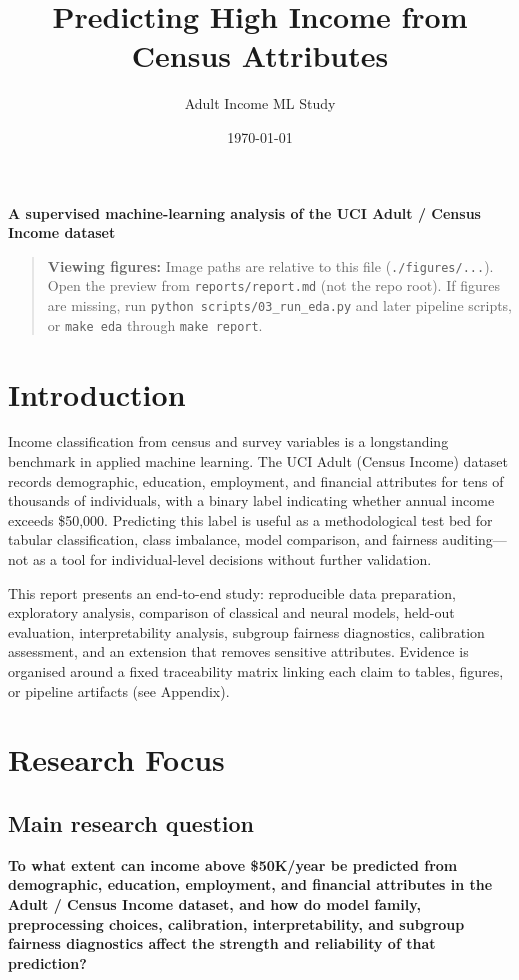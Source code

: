 ﻿\documentclass[11pt,a4paper]{article}
\title{Predicting High Income from Census Attributes}
\author{Adult Income ML Study}
\date{\today}
\begin{document}
\maketitle
\tableofcontents
\newpage

\textbf{A supervised machine-learning analysis of the UCI Adult / Census Income dataset}

\begin{quotation}
\textbf{Viewing figures:} Image paths are relative to this file (\texttt{./figures/...}). Open the preview from \texttt{reports/report.md} (not the repo root). If figures are missing, run \texttt{python scripts/03\_run\_eda.py} and later pipeline scripts, or \texttt{make eda} through \texttt{make report}.
\end{quotation}


\section{Introduction}

Income classification from census and survey variables is a longstanding benchmark in applied machine learning. The UCI Adult (Census Income) dataset records demographic, education, employment, and financial attributes for tens of thousands of individuals, with a binary label indicating whether annual income exceeds \$50,000. Predicting this label is useful as a methodological test bed for tabular classification, class imbalance, model comparison, and fairness auditing—not as a tool for individual-level decisions without further validation.

This report presents an end-to-end study: reproducible data preparation, exploratory analysis, comparison of classical and neural models, held-out evaluation, interpretability analysis, subgroup fairness diagnostics, calibration assessment, and an extension that removes sensitive attributes. Evidence is organised around a fixed traceability matrix linking each claim to tables, figures, or pipeline artifacts (see Appendix).


\section{Research Focus}

\subsection{Main research question}

\textbf{To what extent can income above \$50K/year be predicted from demographic, education, employment, and financial attributes in the Adult / Census Income dataset, and how do model family, preprocessing choices, calibration, interpretability, and subgroup fairness diagnostics affect the strength and reliability of that prediction?}
\end{document}
